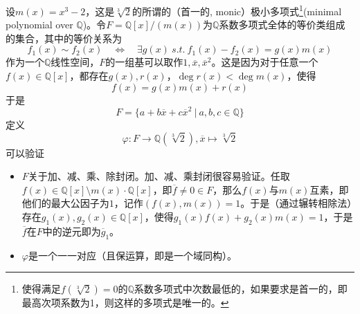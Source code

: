 设$m(x) = x^3 - 2$，这是$\sqrt[3]{2}$的所谓的（首一的, monic）极小多项式\footnote{使得满足$f(\sqrt[3]{2})=0$的$\mathbb{Q}$系数多项式中次数最低的，如果要求是首一的，即最高次项系数为1，则这样的多项式是唯一的。}(minimal polynomial over $\mathbb{Q}$)。令$F = \mathbb{Q}[x] / (m(x))$为$\mathbb{Q}$系数多项式全体的等价类组成的集合，其中的等价关系为
$$f_1(x) \sim f_2(x) \quad \Longleftrightarrow \quad \exists g(x) \ s.t.\ f_1(x)-f_2(x) = g(x)m(x)$$
作为一个$\mathbb{Q}$线性空间，$F$的一组基可以取作$1, \overline{x}, \overline{x}^2$。这是因为对于任意一个$f(x) \in \mathbb{Q}[x]$，都存在$g(x), r(x)$，$\deg r(x) < \deg m(x)$，使得
$$f(x) = g(x)m(x) + r(x)$$
于是
$$F = \{ a + b\overline{x} + c\overline{x}^2 \ |\ a,b,c\in\mathbb{Q} \}$$
定义
$$\varphi : F \to \mathbb{Q}(\sqrt[3]{2}), \overline{x} \mapsto \sqrt[3]{2}$$
可以验证
\begin{itemize}
    \item $F$关于加、减、乘、除封闭。加、减、乘封闭很容易验证。任取$f(x) \in \mathbb{Q}[x] \setminus m(x)\cdot\mathbb{Q}[x]$，即$\overline{f} \neq 0 \in F$，那么$f(x)$与$m(x)$互素，即他们的最大公因子为$1$，记作$(f(x), m(x)) = 1$。于是（通过辗转相除法）存在$g_1(x), g_2(x) \in \mathbb{Q}[x]$，使得$g_1(x)f(x) + g_2(x)m(x) = 1$，于是$\overline{f}$在$F$中的逆元即为$\overline{g}_1$。
    \item $\varphi$是一个一一对应（且保运算，即是一个域同构）。
\end{itemize}


